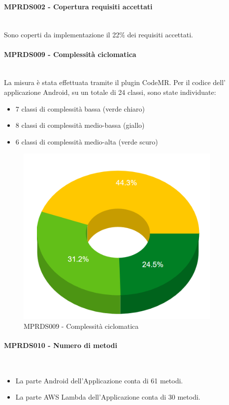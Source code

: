 \paragraph{MPRDS002 - Copertura requisiti accettati}\mbox{}\\[0.4cm]
Sono coperti da implementazione il 22\% dei requisiti accettati.
\paragraph{MPRDS009 - Complessità ciclomatica}\mbox{}\\[0.4cm]
La misura è stata effettuata tramite il plugin CodeMR. Per il codice dell' applicazione Android, su un totale di 24 classi, sono state individuate: \begin{itemize}
\item 7 classi di complessità bassa (verde chiaro)
\item 8 classi di complessità medio-bassa (giallo)
\item 6 classi di complessità medio-alta (verde scuro)
\end{itemize}
\begin{figure}[H]
	\centering
	\includegraphics[width=10cm,keepaspectratio]{../includes/pics/complexity.PNG}
	\caption{\label{fig:mission}MPRDS009 - Complessità ciclomatica}
\end{figure}
\paragraph{MPRDS010 - Numero di metodi}\mbox{}\\[0.4cm]
\begin{itemize}
\item La parte Android dell'Applicazione conta di 61 metodi.
\item La parte AWS Lambda dell'Applicazione conta di 30 metodi.
\end{itemize}

